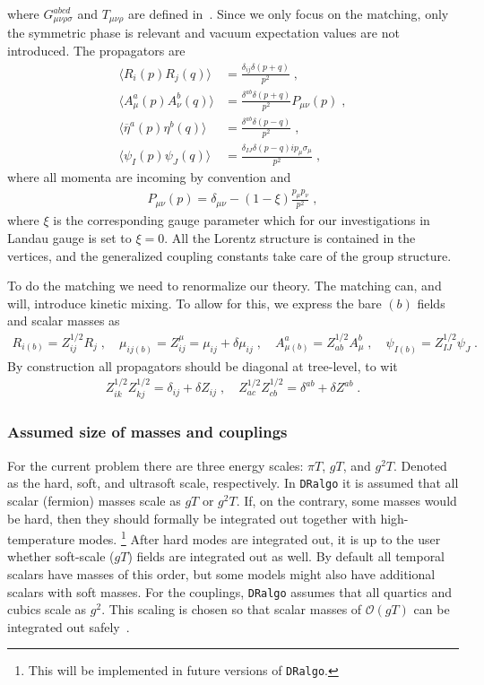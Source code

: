 \documentclass[11pt]{article}
\def\dralgo{{\tt DRalgo}}
\renewcommand{\nn}{\nonumber \\}
\newcommand{\vev}{vacuum expectation value}
\begin{document}
where
$G_{\mu\nu\rho\sigma}^{abcd}$ and
$T_{\mu\nu\rho}$ are defined in~\cite{Martin:2018emo}.
Since we only focus on the matching, only the symmetric phase is relevant and
\vev{}s are not introduced. 
The propagators are
\begin{align}
\label{eq:prop:4d}
  \langle R_i (p) R_j (q) \rangle &=
  \frac{\delta_{ij}\delta(p+q)}{p^2}
  \;, \nn
  \langle A^a_\mu(p) A^b_\nu(q) \rangle &=
 \frac{\delta^{ab}\delta(p+q)}{p^2}  P_{\mu \nu}(p)
  \;, \nn
  \langle   \overline{\eta}^a(p) \eta^b(q) \rangle &=
  \frac{\delta^{ab}\delta(p-q)}{p^2}
  \;, \nn
  \langle \psi_{I}(p) \psi_{J}(q) \rangle &=
  \frac{\delta_{I J}\delta(p-q)i p_\mu \sigma_\mu}{p^2}
  \;,
\end{align}
where all momenta are incoming by convention and
\begin{align}
\label{eq:prop:gauge}
 P_{\mu\nu}(p)=  \delta_{\mu\nu} - (1-\xi)\frac{p_\mu p_\nu}{p^2}
  \;,
\end{align}
where $\xi$ is the corresponding gauge parameter which for our investigations in
Landau gauge is set to $\xi = 0$.
All the Lorentz structure is contained in the vertices, and
the generalized coupling constants take care of the group structure. 

To do the matching we need to renormalize our theory.
The matching can, and  will, introduce kinetic mixing.
To allow for this, we express the bare $(b)$ fields and scalar masses as
\begin{align}
  R_{i(b)}=Z^{1/2}_{ij} R_j
  \;,\quad
  \mu_{ij(b)}=Z^\mu_{ij}=\mu_{ij}^{ }+\delta\mu_{ij}^{ }
  \;,\quad
  {A}^{a}_{\mu(b)}=Z^{1/2}_{ab} A^{b}_{\mu}
  \;,\quad
  \psi_{I(b)}=Z^{1/2}_{IJ}\psi_{J}^{ }
  \;.
\end{align}
By construction all propagators should be diagonal at tree-level, to wit
\begin{align}
  Z^{1/2}_{i k}Z^{1/2}_{k j}=\delta_{ij}+\delta Z_{ij}
  \;,\quad
  Z^{1/2}_{a c}Z^{1/2}_{c b}=\delta^{ab}+\delta Z^{ab}
\;.
\end{align}


\subsubsection*{Assumed size of masses and couplings}

For the current problem there are three energy scales:
$\pi T$, $g T$, and $g^2 T$.
Denoted as the hard, soft, and ultrasoft scale, respectively.
In \dralgo{} it is assumed that all scalar (fermion) masses scale as $g T$ or $g^2 T$.
If, on the contrary, some masses would be hard, then they should formally be integrated out together with high-temperature modes.%
\footnote{
  This will be implemented in future versions of \dralgo{}.
}
After hard modes are integrated out, it is up to the user whether soft-scale ($g T$) fields are integrated out as well.
By default all temporal scalars have masses of this order,
but some models might also have additional scalars with soft masses.
For the couplings, \dralgo{} assumes that all quartics and cubics scale as $g^2$. This scaling is chosen so that scalar masses of $\mathcal{O}(g T)$ can be
integrated out safely~\cite{Niemi:2021qvp}.
\end{document}
